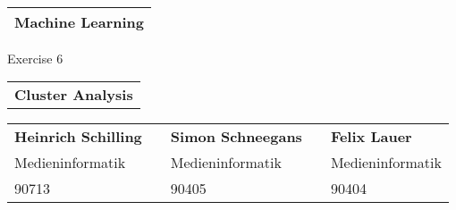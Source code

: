 \thispagestyle{empty}
\ \\[3cm]
\begin{tabular}[b]{l}
    \Huge \textbf{Machine Learning} \hspace{12.5cm} \\[1mm]
    \hline
\end{tabular}

\begin{flushright}
    {\large Exercise 6} \\[8cm]
\end{flushright}

\begin{tabular}[b]{l}
    \LARGE \textbf{Cluster Analysis} \\[4cm]
\end{tabular}

\begin{tabular}{lclcl}
    \textbf{Heinrich Schilling} &\hspace{1cm} &\textbf{Simon Schneegans} &\hspace{1cm} & \textbf{Felix Lauer} \\
    Medieninformatik & \hspace{1cm}  & Medieninformatik & \hspace{1cm} & Medieninformatik \\
    90713  &\hspace{1cm} & 90405  &\hspace{1cm} & 90404 \\[1.5cm]
\end{tabular}

\newpage

